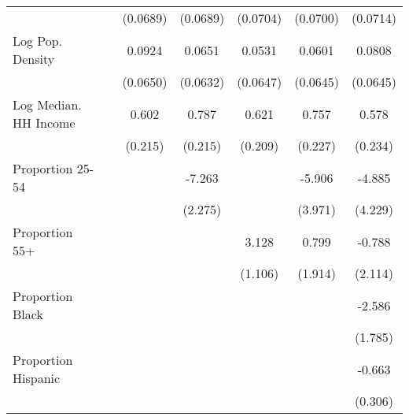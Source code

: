 {\begin{tabular}{l*{6}{c}}
                    &                     &    (0.0689)         &    (0.0689)         &    (0.0704)         &    (0.0700)         &    (0.0714)         \\
\addlinespace
Log Pop. Density    &                     &      0.0924         &      0.0651         &      0.0531         &      0.0601         &      0.0808         \\
                    &                     &    (0.0650)         &    (0.0632)         &    (0.0647)         &    (0.0645)         &    (0.0645)         \\
\addlinespace
Log Median. HH Income&                     &       0.602\sym{**} &       0.787\sym{***}&       0.621\sym{**} &       0.757\sym{**} &       0.578\sym{*}  \\
                    &                     &     (0.215)         &     (0.215)         &     (0.209)         &     (0.227)         &     (0.234)         \\
\addlinespace
Proportion 25-54    &                     &                     &      -7.263\sym{**} &                     &      -5.906         &      -4.885         \\
                    &                     &                     &     (2.275)         &                     &     (3.971)         &     (4.229)         \\
\addlinespace
Proportion 55+      &                     &                     &                     &       3.128\sym{**} &       0.799         &      -0.788         \\
                    &                     &                     &                     &     (1.106)         &     (1.914)         &     (2.114)         \\
\addlinespace
Proportion Black    &                     &                     &                     &                     &                     &      -2.586         \\
                    &                     &                     &                     &                     &                     &     (1.785)         \\
\addlinespace
Proportion Hispanic &                     &                     &                     &                     &                     &      -0.663\sym{*}  \\
                    &                     &                     &                     &                     &                     &     (0.306)         \\

\end{tabular}}
